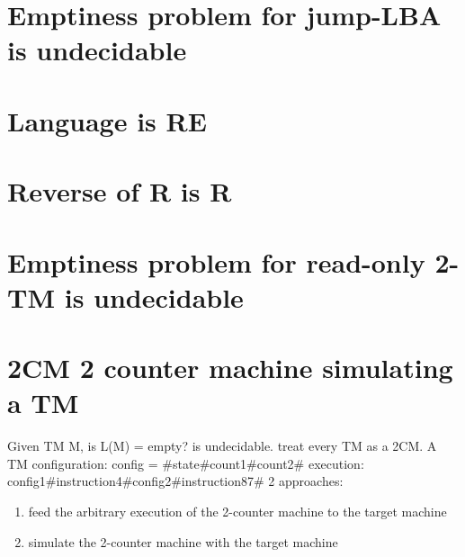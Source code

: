 \documentclass{article}
\begin{document}
\section{Emptiness problem for jump-LBA is undecidable}

\section{Language is RE}

\section{Reverse of R is R}

\section{Emptiness problem for read-only 2-TM is undecidable}

\section{2CM 2 counter machine simulating a TM}
Given TM M, is L(M) = empty? is undecidable.
treat every TM as a 2CM. A TM configuration:
config = #state#count1#count2#
execution:
config1#instruction4#config2#instruction87#
2 approaches:
\begin{enumerate}
	\item feed the arbitrary execution of the 2-counter machine to the target machine
	\item simulate the 2-counter machine with the target machine
\end{enumerate}
\end{document}
